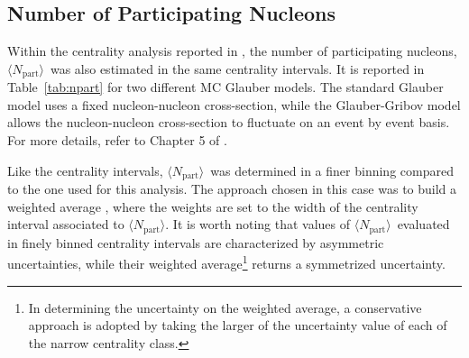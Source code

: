 \documentclass[NOTE, atlasdraft=true, texlive=2020, UKenglish]{atlasdoc}
\newcommand{\NPART}{$\langle N_{\TN{part}} \rangle$}
\newcommand{\TN}[1]{ \text{#1} }
\begin{document}
\subsection{Number of Participating Nucleons}
\label{ssec:TABsec}
Within the centrality analysis reported in \cite{Hill:2301540}, the number of participating nucleons, \NPART\ was also estimated in the same centrality intervals. It is reported in Table~\ref{tab:npart} for two different MC Glauber models. 
The standard Glauber model uses a fixed nucleon-nucleon cross-section, while the Glauber-Gribov model allows the nucleon-nucleon cross-section to fluctuate on an event by event basis. For more details, refer to Chapter 5 of \cite{Hill:2301540}.

Like the centrality intervals, \NPART\ was determined in a finer binning compared to the one used for this analysis. The approach chosen in this case was to build a weighted average \cite{UnbWeight}, where the weights are set to the width of the centrality interval associated to \NPART. It is worth noting that values of \NPART\ evaluated in finely binned centrality intervals are characterized by asymmetric uncertainties, while their weighted average\footnote{In determining the uncertainty on the weighted average, a conservative approach is adopted by taking the larger of the uncertainty value of each of the narrow centrality class.} returns a symmetrized uncertainty.
\end{document}
